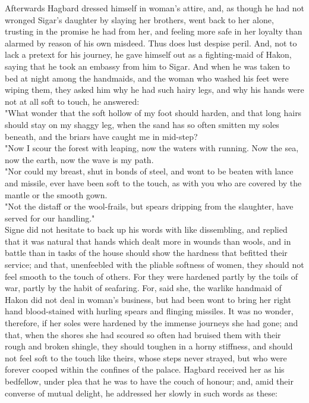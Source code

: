 \documentclass[10pt,a4paper]{report}
\begin{document}
Afterwards Hagbard dressed himself in woman's attire, and, as though he had not wronged Sigar's daughter by slaying her brothers, went back to her alone, trusting in the promise he had from her, and feeling more safe in her loyalty than alarmed by reason of his own misdeed. Thus does lust despise peril. And, not to lack a pretext for his journey, he gave himself out as a fighting-maid of Hakon, saying that he took an embassy from him to Sigar. And when he was taken to bed at night among the handmaids, and the woman who washed his feet were wiping them, they asked him why he had such hairy legs, and why his hands were not at all soft to touch, he answered:\\

"What wonder that the soft hollow of my foot should harden, and that long hairs should stay on my shaggy leg, when the sand has so often smitten my soles beneath, and the briars have caught me in mid-step?\\

"Now I scour the forest with leaping, now the waters with running. Now the sea, now the earth, now the wave is my path.\\

"Nor could my breast, shut in bonds of steel, and wont to be beaten with lance and missile, ever have been soft to the touch, as with you who are covered by the mantle or the smooth gown.\\

"Not the distaff or the wool-frails, but spears dripping from the slaughter, have served for our handling."\\

Signe did not hesitate to back up his words with like dissembling, and replied that it was natural that hands which dealt more in wounds than wools, and in battle than in tasks of the house should show the hardness that befitted their service; and that, unenfeebled with the pliable softness of women, they should not feel smooth to the touch of others. For they were hardened partly by the toils of war, partly by the habit of seafaring. For, said she, the warlike handmaid of Hakon did not deal in woman's business, but had been wont to bring her right hand blood-stained with hurling spears and flinging missiles. It was no wonder, therefore, if her soles were hardened by the immense journeys she had gone; and that, when the shores she had scoured so often had bruised them with their rough and broken shingle, they should toughen in a horny stiffness, and should not feel soft to the touch like theirs, whose steps never strayed, but who were forever cooped within the confines of the palace. Hagbard received her as his bedfellow, under plea that he was to have the couch of honour; and, amid their converse of mutual delight, he addressed her slowly in such words as these:\\
\end{document}
